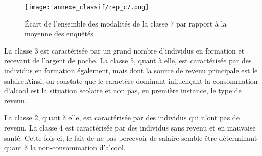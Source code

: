 \documentclass{article}
\begin{document}
\begin{figure}[H]
  \centering
  \texttt{[image: annexe\_classif/rep\_c7.png]} 
  \caption{Écart de l’ensemble des modalités de la classe 7 par rapport à la moyenne des enquêtés}
  \label{fig:annexe27}
\end{figure}
La classe 3 est caractérisée par un grand nombre d'individus en formation et recevant de l'argent de poche. La classe 5, quant à elle, est caractérisée par des individus en formation également, mais dont la source de revenu principale est le salaire.Ainsi, on constate que le caractère dominant influençant la consommation d'alcool est la situation scolaire et non pas, en première instance, le type de revenu.

La classe 2, quant à elle, est caractérisée par des individus qui n'ont pas de revenu. La classe 4 est caractérisée par des individus sans revenu et en mauvaise santé. Cette fois-ci, le fait de ne pas percevoir de salaire semble être déterminant quant à la non-consommation d'alcool.
\end{document}
